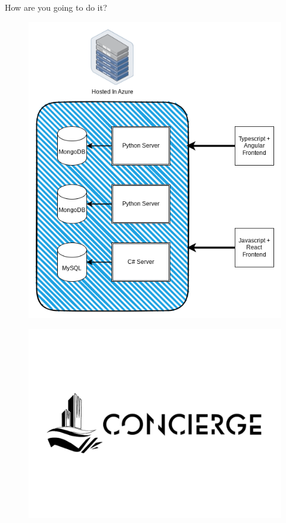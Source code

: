 \documentclass{beamer}
\begin{document}
\beamerdefaultoverlayspecification{<*>}
\begin{frame}{How are you going to do it?}
    \begin{figure}
        \centering
        \includegraphics[width=0.65\linewidth]{images/Diagram.png}
    \end{figure}
\end{frame}

\begin{frame}
    \begin{figure}
        \centering
        \includegraphics[width=1\linewidth]{images/logo.png}
    \end{figure}
\end{frame}
\end{document}
